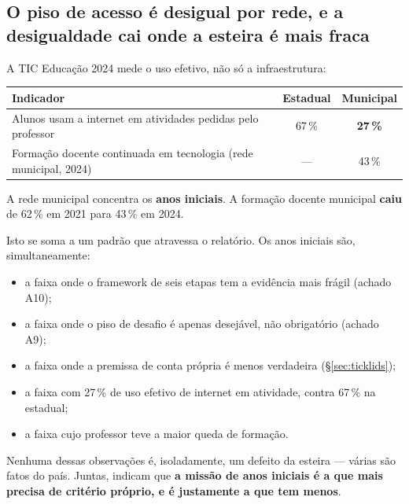\documentclass[11pt,a4paper]{article}
\begin{document}
\subsection{O piso de acesso \'e desigual por rede, e a desigualdade cai onde a esteira \'e mais fraca}

A TIC Educa\c{c}\~ao 2024 \cite{ticedu2024} mede o uso efetivo, n\~ao s\'o a infraestrutura:

\begin{center}
\begin{tabular}{@{}p{8.4cm} c c@{}}
\toprule
\textbf{Indicador} & \textbf{Estadual} & \textbf{Municipal} \\
\midrule
Alunos usam a internet em atividades pedidas pelo professor & 67\,\% & \textbf{27\,\%} \\
Forma\c{c}\~ao docente continuada em tecnologia (rede municipal, 2024) & --- & 43\,\% \\
\bottomrule
\end{tabular}
\end{center}

A rede municipal concentra os \textbf{anos iniciais}. A forma\c{c}\~ao docente municipal
\textbf{caiu} de 62\,\% em 2021 para 43\,\% em 2024.

\begin{tesebox}
Isto se soma a um padr\~ao que atravessa o relat\'orio. Os anos iniciais s\~ao, simultaneamente:

\begin{itemize}
  \item a faixa onde o framework de seis etapas tem a evid\^encia mais fr\'agil (achado A10);
  \item a faixa onde o piso de desafio \'e apenas desej\'avel, n\~ao obrigat\'orio (achado A9);
  \item a faixa onde a premissa de conta pr\'opria \'e menos verdadeira (\S\ref{sec:ticklids});
  \item a faixa com 27\,\% de uso efetivo de internet em atividade, contra 67\,\% na estadual;
  \item a faixa cujo professor teve a maior queda de forma\c{c}\~ao.
\end{itemize}

Nenhuma dessas observa\c{c}\~oes \'e, isoladamente, um defeito da esteira --- v\'arias s\~ao fatos
do pa\'is. Juntas, indicam que \textbf{a miss\~ao de anos iniciais \'e a que mais precisa de
crit\'erio pr\'oprio, e \'e justamente a que tem menos}.
\end{tesebox}
\end{document}

